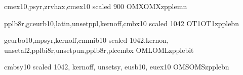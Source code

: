 %
      {cmex10,psyr,zrvhax,cmex10 scaled 900}
      {OMX}{OMX}{zpple}{m}{n}{}


      {pplb8r,gceurb10,latin,unsetppl,kernoff,cmbx10 scaled 1042}
      {OT1}{OT1}{zpple}{b}{n}{}
      
      {geurbo10,mpsyr,kernoff,cmmib10 scaled 1042,kernon,
       unsetal2,pplbi8r,unsetpun,pplb8r,plcembx} 
      {OML}{OML}{zpple}{b}{it}{}

      {cmbsy10 scaled 1042, kernoff, unsetsy, eusb10, euex10}
      {OMS}{OMS}{zpple}{b}{n}{}
      
   
\endinstallfonts


\bye
